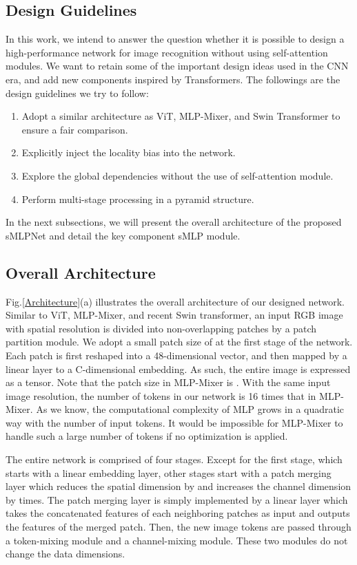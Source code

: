 \documentclass[letterpaper]{article} \usepackage{aaai22}  \usepackage{times}  \usepackage{helvet}  \usepackage{courier}  \usepackage[hyphens]{url}  \usepackage{graphicx} \usepackage{color}
\begin{document}
\subsection{Design Guidelines}
In this work, we intend to answer the question whether it is possible to design a high-performance network for image recognition without using self-attention modules. We want to retain some of the important design ideas used in the CNN era, and add new components inspired by Transformers. The followings are the design guidelines we try to follow:
\begin{enumerate}
    \item Adopt a similar architecture as ViT, MLP-Mixer, and Swin Transformer to ensure a fair comparison.
    \item Explicitly inject the locality bias into the network.
    \item Explore the global dependencies without the use of self-attention module.
    \item Perform multi-stage processing in a pyramid structure.
\end{enumerate}
In the next subsections, we will present the overall architecture of the proposed sMLPNet and detail the key component sMLP module. 

\subsection{Overall Architecture}

Fig.\ref{Architecture}(a) illustrates the overall architecture of our designed network. Similar to ViT, MLP-Mixer, and recent Swin transformer, an input RGB image with spatial resolution  is divided into non-overlapping patches by a patch partition module. We adopt a small patch size of  at the first stage of the network. Each patch is first reshaped into a 48-dimensional vector, and then mapped by a linear layer to a C-dimensional embedding. As such, the entire image is expressed as a  tensor. Note that the patch size in MLP-Mixer is . With the same input image resolution, the number of tokens in our network is 16 times that in MLP-Mixer. As we know, the computational complexity of MLP grows in a quadratic way with the number of input tokens. It would be impossible for MLP-Mixer to handle such a large number of tokens if no optimization is applied. 

The entire network is comprised of four stages. Except for the first stage, which starts with a linear embedding layer, other stages start with a patch merging layer which reduces the spatial dimension by  and increases the channel dimension by  times. The patch merging layer is simply implemented by a linear layer which takes the concatenated features of each  neighboring patches as input and outputs the features of the merged patch. Then, the new image tokens are passed through a token-mixing module and a channel-mixing module. These two modules do not change the data dimensions.
\end{document}
